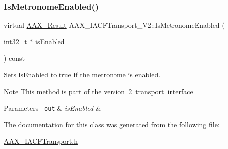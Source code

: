 \subsubsection{\texorpdfstring{IsMetronomeEnabled()}{IsMetronomeEnabled()}}
{\footnotesize\ttfamily virtual \mbox{\hyperlink{a00392_a4d8f69a697df7f70c3a8e9b8ee130d2f}{A\+A\+X\+\_\+\+Result}} A\+A\+X\+\_\+\+I\+A\+C\+F\+Transport\+\_\+\+V2\+::\+Is\+Metronome\+Enabled (\begin{DoxyParamCaption}\item[{int32\+\_\+t $\ast$}]{is\+Enabled }\end{DoxyParamCaption}) const\hspace{0.3cm}{\ttfamily [pure virtual]}}



Sets is\+Enabled to true if the metronome is enabled. 

\begin{DoxyNote}{Note}
This method is part of the \mbox{\hyperlink{a01761}{version 2 transport interface}}
\end{DoxyNote}

\begin{DoxyParams}[1]{Parameters}
\mbox{\texttt{ out}}  & {\em is\+Enabled} & \\
\hline
\end{DoxyParams}


The documentation for this class was generated from the following file\+:\begin{DoxyCompactItemize}
\item 
\mbox{\hyperlink{a00557}{A\+A\+X\+\_\+\+I\+A\+C\+F\+Transport.\+h}}\end{DoxyCompactItemize}
